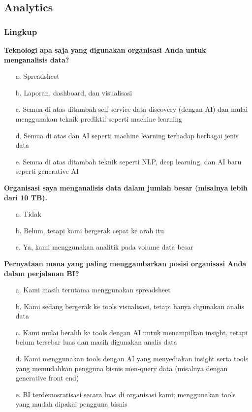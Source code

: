 \documentclass{article}
\begin{document}
\subsection{Analytics}

\subsubsection{Lingkup}

\textbf{Teknologi apa saja yang digunakan organisasi Anda untuk menganalisis data?}

\begin{enumerate}
	\item[a.] Spreadsheet
	\item[b.] Laporan, dashboard, dan visualisasi
	\item[c.] Semua di atas ditambah self-service data discovery (dengan AI) dan mulai menggunakan teknik prediktif seperti machine learning
	\item[d.] Semua di atas dan AI seperti machine learning terhadap berbagai jenis data
	\item[e.] Semua di atas ditambah teknik seperti NLP, deep learning, dan AI baru seperti generative AI
\end{enumerate}

\textbf{Organisasi saya menganalisis data dalam jumlah besar (misalnya lebih dari 10 TB).}

\begin{enumerate}
	\item[a.] Tidak
	\item[b.] Belum, tetapi kami bergerak cepat ke arah itu
	\item[c.] Ya, kami menggunakan analitik pada volume data besar
\end{enumerate}

\textbf{Pernyataan mana yang paling menggambarkan posisi organisasi Anda dalam perjalanan BI?}

\begin{enumerate}
	\item[a.] Kami masih terutama menggunakan spreadsheet
	\item[b.] Kami sedang bergerak ke tools visualisasi, tetapi hanya digunakan analis data
	\item[c.] Kami mulai beralih ke tools dengan AI untuk menampilkan insight, tetapi belum tersebar luas dan masih digunakan analis data
	\item[d.] Kami menggunakan tools dengan AI yang menyediakan insight serta tools yang memudahkan pengguna bisnis men-query data (misalnya dengan generative front end)
	\item[e.] BI terdemosratisasi secara luas di organisasi kami; menggunakan tools yang mudah dipakai pengguna bisnis
\end{enumerate}
\end{document}
